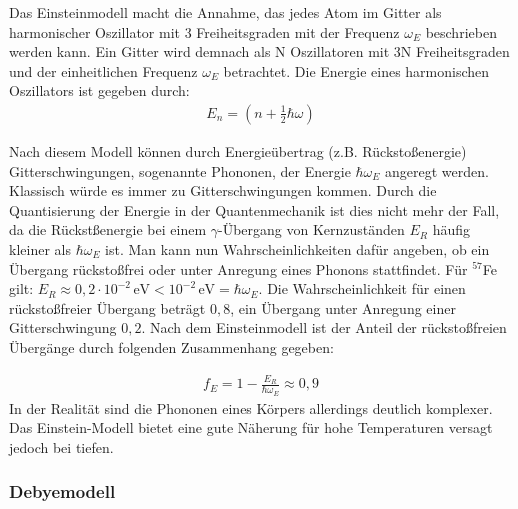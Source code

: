 Das Einsteinmodell macht die Annahme, das jedes Atom im Gitter als harmonischer Oszillator mit 3 Freiheitsgraden mit der Frequenz $\omega_E$ beschrieben werden kann. Ein Gitter wird demnach als N Oszillatoren mit 3N Freiheitsgraden und der einheitlichen Frequenz  $\omega_E$ betrachtet. Die Energie eines harmonischen Oszillators ist gegeben durch:
\begin{align}
E_n=\left( n+\frac{1}{2}\hbar\omega\right) 
\end{align} 

Nach diesem Modell können durch Energieübertrag  (z.B. Rückstoßenergie)  Gitterschwingungen, sogenannte Phononen, der Energie $\hbar \omega_E$ angeregt werden. Klassisch würde es immer zu Gitterschwingungen kommen. Durch die Quantisierung der Energie in der Quantenmechanik ist dies nicht mehr der Fall, da die Rückstßenergie bei einem $\gamma$-Übergang von Kernzuständen $E_R$ häufig kleiner als $\hbar \omega_E$ ist. Man kann nun Wahrscheinlichkeiten dafür angeben, ob ein Übergang rückstoßfrei oder unter Anregung eines Phonons stattfindet. Für  $^{57}$Fe gilt:
$E_R\approx0,2\cdot10^{-2}\,\mathrm{eV} < 10^{-2}\,\mathrm{eV}=\hbar\omega_E $. Die Wahrscheinlichkeit für einen rückstoßfreier Übergang beträgt $0,8$, ein Übergang unter Anregung einer Gitterschwingung $0,2$. Nach dem Einsteinmodell ist der Anteil der rückstoßfreien Übergänge durch folgenden Zusammenhang gegeben:

\begin{align}
f_E = 1-\frac{E_R}{\hbar \omega_E}\approx0,9
\end{align}
In der Realität sind die Phononen eines Körpers allerdings deutlich komplexer. Das Einstein-Modell bietet eine gute Näherung für hohe Temperaturen versagt jedoch bei tiefen.

\subsubsection{Debyemodell}

